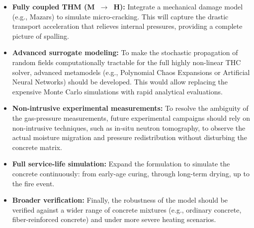 \begin{itemize}
    \item \textbf{Fully coupled THM (M~$\rightarrow$~H):} Integrate a mechanical damage model (e.g., Mazars) to simulate micro-cracking. This will capture the drastic transport acceleration that relieves internal pressures, providing a complete picture of spalling.
    \item \textbf{Advanced surrogate modeling:} To make the stochastic propagation of random fields computationally tractable for the full highly non-linear THC solver, advanced metamodels (e.g., Polynomial Chaos Expansions or Artificial Neural Networks) should be developed. This would allow replacing the expensive Monte Carlo simulations with rapid analytical evaluations.
    \item \textbf{Non-intrusive experimental measurements:} To resolve the ambiguity of the gas-pressure measurements, future experimental campaigns should rely on non-intrusive techniques, such as in-situ neutron tomography, to observe the actual moisture migration and pressure redistribution without disturbing the concrete matrix.
    \item \textbf{Full service-life simulation:} Expand the formulation to simulate the concrete continuously: from early-age curing, through long-term drying, up to the fire event.
    \item \textbf{Broader verification:} Finally, the robustness of the model should be verified against a wider range of concrete mixtures (e.g., ordinary concrete, fiber-reinforced concrete) and under more severe heating scenarios.
\end{itemize}